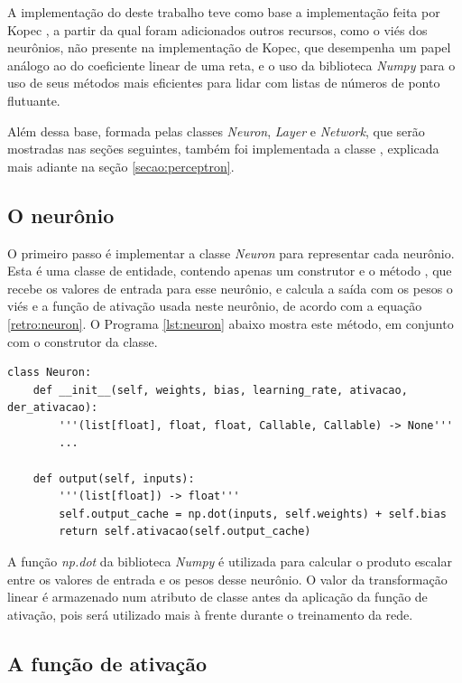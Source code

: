 A implementação do  deste trabalho teve como base a implementação feita por Kopec \citep{classic}, a partir da qual foram adicionados outros recursos, como o viés dos neurônios, não presente na implementação de Kopec, que desempenha um papel análogo ao do coeficiente linear de uma reta, e o uso da biblioteca \emph{Numpy} para o uso de seus métodos mais eficientes para lidar com listas de números de ponto flutuante. 

Além dessa base, formada pelas classes \emph{Neuron}, \emph{Layer} e \emph{Network}, que serão mostradas nas seções seguintes, também foi implementada a classe , explicada mais adiante na seção \ref{secao:perceptron}.

\subsection{O neurônio}

O primeiro passo é implementar a classe \emph{Neuron} para representar cada neurônio. Esta é uma classe de entidade, contendo apenas um construtor e o método , que recebe os valores de entrada para esse neurônio, e calcula a saída com os pesos o viés e a função de ativação usada neste neurônio, de acordo com a equação \eqref{retro:neuron}. O Programa \ref{lst:neuron} abaixo mostra este método, em conjunto com o construtor da classe.

\newpage

\estiloR
\begin{lstlisting}[caption={Trecho da classe Neuron}, label={lst:neuron}, escapeinside={\%}]
class Neuron:
    def __init__(self, weights, bias, learning_rate, ativacao, der_ativacao):
        '''(list[float], float, float, Callable, Callable) -> None'''
        ...

    def output(self, inputs):
        '''(list[float]) -> float'''
        self.output_cache = np.dot(inputs, self.weights) + self.bias
        return self.ativacao(self.output_cache)
\end{lstlisting}


A função \emph{np.dot} da biblioteca \emph{Numpy} é utilizada para calcular o produto escalar entre os valores de entrada e os pesos desse neurônio. O valor da transformação linear é armazenado num atributo de classe antes da aplicação da função de ativação, pois será utilizado mais à frente durante o treinamento da rede.

\subsection{A função de ativação}

